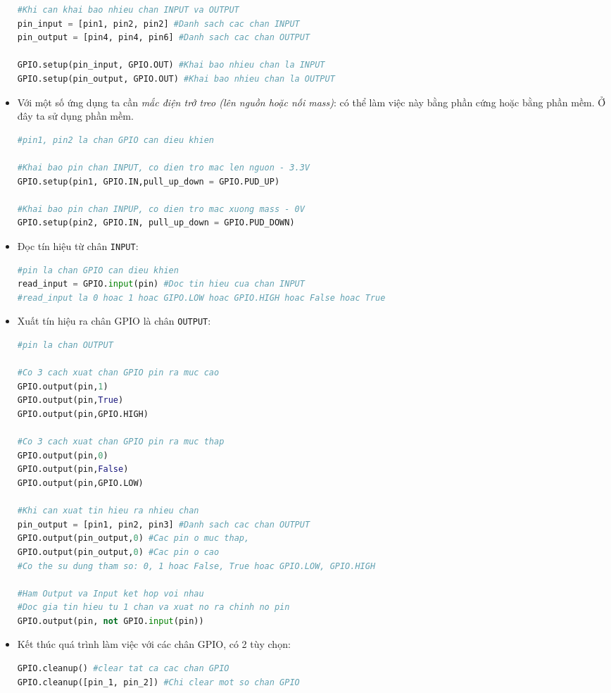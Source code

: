 \begin{itemize}
\begin{lstlisting}[language=Python]
#Khi can khai bao nhieu chan INPUT va OUTPUT
pin_input = [pin1, pin2, pin2] #Danh sach cac chan INPUT
pin_output = [pin4, pin4, pin6] #Danh sach cac chan OUTPUT

GPIO.setup(pin_input, GPIO.OUT) #Khai bao nhieu chan la INPUT
GPIO.setup(pin_output, GPIO.OUT) #Khai bao nhieu chan la OUTPUT
\end{lstlisting}
\item Với một số ứng dụng ta cần \textit{mắc điện trở treo (lên nguồn hoặc nối mass)}: có thể làm việc này bằng phần cứng hoặc bằng phần mềm. Ở đây ta sử dụng phần mềm.
\begin{lstlisting}[language=Python]
#pin1, pin2 la chan GPIO can dieu khien

#Khai bao pin chan INPUT, co dien tro mac len nguon - 3.3V
GPIO.setup(pin1, GPIO.IN,pull_up_down = GPIO.PUD_UP) 

#Khai bao pin chan INPUP, co dien tro mac xuong mass - 0V
GPIO.setup(pin2, GPIO.IN, pull_up_down = GPIO.PUD_DOWN) 
\end{lstlisting}
\item Đọc tín hiệu từ chân \verb|INPUT|:
\begin{lstlisting}[language=Python]
#pin la chan GPIO can dieu khien
read_input = GPIO.input(pin) #Doc tin hieu cua chan INPUT
#read_input la 0 hoac 1 hoac GIPO.LOW hoac GPIO.HIGH hoac False hoac True
\end{lstlisting}
\item Xuất tín hiệu ra chân GPIO là chân \verb|OUTPUT|:
\begin{lstlisting}[language=Python]
#pin la chan OUTPUT

#Co 3 cach xuat chan GPIO pin ra muc cao
GPIO.output(pin,1)
GPIO.output(pin,True) 
GPIO.output(pin,GPIO.HIGH) 

#Co 3 cach xuat chan GPIO pin ra muc thap
GPIO.output(pin,0)
GPIO.output(pin,False) 
GPIO.output(pin,GPIO.LOW)

#Khi can xuat tin hieu ra nhieu chan
pin_output = [pin1, pin2, pin3] #Danh sach cac chan OUTPUT
GPIO.output(pin_output,0) #Cac pin o muc thap, 
GPIO.output(pin_output,0) #Cac pin o cao
#Co the su dung tham so: 0, 1 hoac False, True hoac GPIO.LOW, GPIO.HIGH 

#Ham Output va Input ket hop voi nhau
#Doc gia tin hieu tu 1 chan va xuat no ra chinh no pin
GPIO.output(pin, not GPIO.input(pin))
\end{lstlisting}
\item Kết thúc quá trình làm việc với các chân GPIO, có 2 tùy chọn:
\begin{lstlisting}[language=Python]
GPIO.cleanup() #clear tat ca cac chan GPIO
GPIO.cleanup([pin_1, pin_2]) #Chi clear mot so chan GPIO
\end{lstlisting}
\end{itemize}
